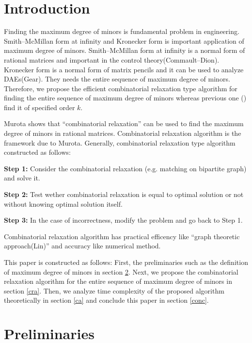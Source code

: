 \section{Introduction}
\label{intro}

Finding the maximum degree of minors is fundamental problem in engineering. 
Smith--McMillan form at infinity and Kronecker form is important application of maximum degree of minors.
Smith--McMillan form at infinity is a normal form of rational matrices 
and important in the control theory(Commault--Dion\cite{SMF}).
Kronecker form is a normal form of matrix pencils and it can be used to analyze DAEs(Gear\cite{DAE}).
They needs the entire sequence of maximum degree of minors. 
Therefore, we propose the efficient combinatorial relaxation type algorithm 
for finding the entire sequence of maximum degree of minors 
whereas previous one (\cite{PDCRA,PCRA}) find it of specified order $k$. 

Murota\cite{PCRA,DCRA} shows that 
“combinatorial relaxation” can be used to find the maximum degree of minors in rational matrices. 
Combinatorial relaxation algorithm is the framework due to Murota\cite{CRA}. 
Generally, combinatorial relaxation type algorithm constructed as follows:
\begin{description}
\item{{\bf Step 1:}} Consider the combinatorial relaxation (e.g. matching on bipartite graph) and solve it.
\item{{\bf Step 2:}} Test wether combinatorial relaxation is equal to optimal solution or not without knowing optimal solution itself. 
\item{{\bf Step 3:}} In the case of incorrectness, modify the problem and go back to Step 1.
\end{description}

Combinatorial relaxation algorithm has practical efficency like “graph theoretic approach(Lin\cite{SC})” 
and accuracy like numerical method.

This paper is constructed as follows:
First, the preliminaries such as the definition of maximum degree of minors in section \ref{pre}. 
Next, we propose the combinatorial relaxation algorithm for the entire sequence of maximum degree of minors in section \ref{cra}.
Then, we analyze time complexity of the proposed algorithm theoretically in section \ref{ca} and 
conclude this paper in section \ref{conc}.



\section{Preliminaries}
\label{pre}
